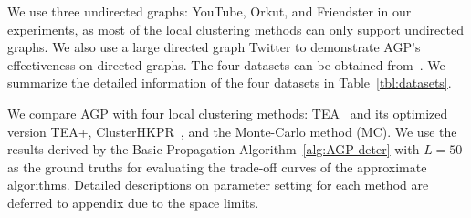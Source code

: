 







We use three undirected graphs: YouTube, Orkut, and Friendster in our experiments, as most of the local clustering methods can only support undirected graphs. We also use a large directed graph Twitter to demonstrate AGP's effectiveness on directed graphs. The four datasets can be obtained from~\cite{snapnets,LWA}. We summarize the detailed information of the four datasets in Table~\ref{tbl:datasets}. 



We compare AGP with four local clustering methods: TEA~\cite{yang2019TEA} and its optimized version TEA+, ClusterHKPR~\cite{chung2018computing}, and the Monte-Carlo method (MC). We use the results derived by the Basic Propagation Algorithm~\ref{alg:AGP-deter} with $L = 50$ as the ground truths for evaluating the trade-off curves of the approximate algorithms. Detailed descriptions on parameter setting for each method are deferred to appendix due to the space limits. 






